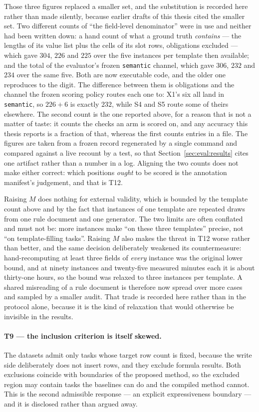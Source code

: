 Those three figures replaced a smaller set, and the substitution is recorded here rather
than made silently, because earlier drafts of this thesis cited the smaller set. Two
different counts of ``the field-level denominator'' were in use and neither had been written
down: a hand count of what a ground truth \emph{contains} --- the lengths of its value list
plus the cells of its slot rows, obligations excluded --- which gave $304$, $226$ and $225$
over the five instances per template then available; and the total of the evaluator's frozen
\texttt{semantic} channel, which gave $306$, $232$ and $234$ over the same five. Both are
now executable code, and the older one reproduces to the digit. The difference between them
is obligations and the channel the frozen scoring policy routes each one to: X1's six all
land in \texttt{semantic}, so $226+6$ is exactly $232$, while S4 and S5 route some of theirs
elsewhere. The second count is the one reported above, for a reason that is not a matter of
taste: it counts the checks an arm is scored on, and any accuracy this thesis reports is a
fraction of that, whereas the first counts entries in a file. The figures are taken from a
frozen record regenerated by a single command and compared against a live recount by a test,
so that Section~\ref{sec:eval:results} cites one artifact rather than a number in a log.
Aligning the two counts does not make either correct: which positions \emph{ought} to be
scored is the annotation manifest's judgement, and that is T12.

Raising $M$ does nothing for external validity, which is bounded by the template count above
and by the fact that instances of one template are repeated draws from one rule document and
one generator. The two limits are often conflated and must not be: more instances make ``on
these three templates'' precise, not ``on template-filling tasks''. Raising $M$ also makes the
threat in T12 worse rather than better, and the same decision deliberately weakened its
countermeasure: hand-recomputing at least three fields of \emph{every} instance was the
original lower bound, and at ninety instances and twenty-five measured minutes each it is
about thirty-one hours, so the bound was relaxed to three instances per template. A shared
misreading of a rule document is therefore now spread over more cases and sampled by a smaller
audit. That trade is recorded here rather than in the protocol alone, because it is the kind
of relaxation that would otherwise be invisible in the results.

\paragraph{T9 --- the inclusion criterion is itself skewed.}
The datasets admit only tasks whose target row count is fixed, because the write side
deliberately does not insert rows, and they exclude formula results. Both exclusions coincide
with boundaries of the proposed method, so the excluded region may contain tasks the baselines
can do and the compiled method cannot. This is the second admissible response --- an explicit
expressiveness boundary --- and it is disclosed rather than argued away.

